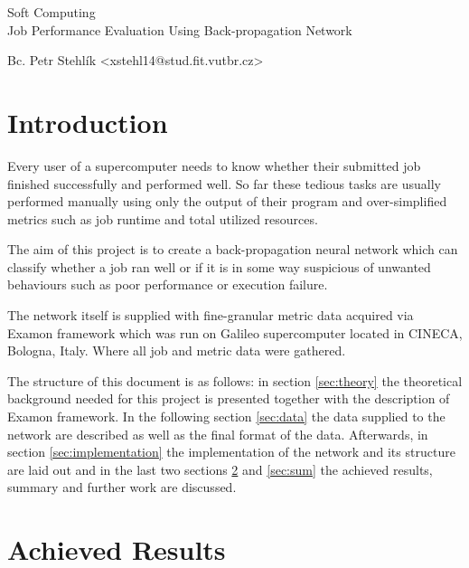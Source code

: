 \documentclass[11pt,a4paper]{article}
\begin{document}
\begin{center}
	\LARGE{Soft Computing}\\
	\Large{Job Performance Evaluation Using Back-propagation Network}
	\vspace{0.5cm}

    \begin{centering}
    \small{
        Bc. Petr Stehlík <xstehl14@stud.fit.vutbr.cz>
        }
    \end{centering}

	\vspace{0.2cm}

\end{center}

\section{Introduction}
Every user of a supercomputer needs to know whether their submitted job finished successfully and performed well. So far these tedious tasks are usually performed manually using only the output of their program and over-simplified metrics such as job runtime and total utilized resources.

The aim of this project is to create a back-propagation neural network which can classify whether a job ran well or if it is in some way suspicious of unwanted behaviours such as poor performance or execution failure.

The network itself is supplied with fine-granular metric data acquired via Examon framework\cite{examon} which was run on Galileo supercomputer located in CINECA, Bologna, Italy. Where all job and metric data were gathered.

The structure of this document is as follows: in section \ref{sec:theory} the theoretical background needed for this project is presented together with the description of Examon framework. In the following section \ref{sec:data} the data supplied to the network are described as well as the final format of the data. Afterwards, in section \ref{sec:implementation} the implementation of the network and its structure are laid out and in the last two sections \ref{sec:res} and \ref{sec:sum} the achieved results, summary and further work are discussed.







\section{Achieved Results}
\label{sec:res}
\end{document}
